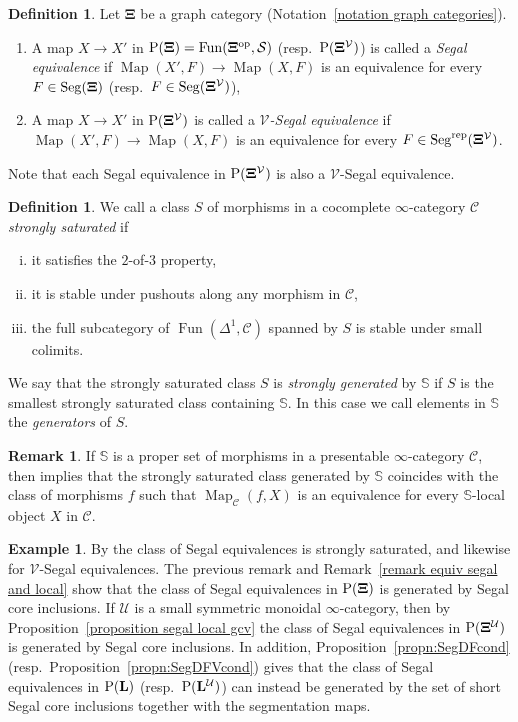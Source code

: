 \documentclass{amsart}
\numberwithin{theorem}{subsection}
\theoremstyle{definition}
\newtheorem{definition}[theorem]{Definition}
\newtheorem{example}[theorem]{Example}
\newtheorem{remark}[theorem]{Remark}
\providecommand{\op}{\mathrm{op}}
\newcommand{\xFun}{\operatorname{Fun}}
\newcommand{\xMap}{\operatorname{Map}}
\newcommand{\Map}{\operatorname{Map}}
\newcommand{\xcc}{\mathcal{C}}
\newcommand{\xS}{\mathcal{S}}
\newcommand{\xU}{\mathcal{U}}
\newcommand{\xV}{\mathcal{V}}
\newcommand{\Pre}{\name{P}}
\newcommand{\icat}{$\infty$-category}
\newcommand{\name}[1]{\ensuremath{\text{\textup{#1}}}}
\newcommand{\levelg}{\mathbf{L}}
\newcommand{\levelU}{\levelg^\xU}
\newcommand{\gc}{\mathbf{\Xi}}
\newcommand{\gcV}{\gc^{\xV}}
\newcommand{\Seg}{\name{Seg}}
\newcommand{\Segrep}{\Seg^{\name{rep}}}
\begin{document}
\begin{definition}\label{def set s}
Let $\gc$ be a graph category (Notation~\ref{notation graph categories}).
	\begin{enumerate}
		\item A map $X \to X'$ in $\Pre(\gc) = \xFun(\gc^\op,\xS)$ (resp.\ $\Pre(\gcV)$) is called a \emph{Segal equivalence} if $\Map(X', F) \to \Map(X, F)$ is an equivalence for every $F\in \Seg(\gc)$ (resp.\ $F\in \Seg(\gcV)$),
		\item A map $X \to X'$ in $\Pre(\gcV)$ is called a \emph{$\xV$-Segal equivalence} if $\Map(X', F) \to \Map(X, F)$ is an equivalence for every $F\in \Segrep(\gcV)$.
	\end{enumerate}
\end{definition}
Note that each Segal equivalence in $\Pre(\gcV)$ is also a $\xV$-Segal equivalence.
\begin{definition}\label{def strongly saturated}
	We call a class $S$ of morphisms in a cocomplete $\infty$-category $\xcc$ \emph{strongly saturated} if 
	\begin{enumerate}[(i)]
		\item it satisfies the $2$-of-$3$ property,
		\item it is stable under pushouts along any morphism in $\xcc$,
		\item the full subcategory of $\xFun(\Delta^1, \xcc)$ spanned by $S$ is stable under small colimits.
	\end{enumerate}
	We say that the strongly saturated class $S$ is \emph{strongly generated} by $\mathbb S$ if $S$ is the smallest strongly saturated class containing $\mathbb S$. In this case we call elements in $\mathbb S$ the \emph{generators} of $S$.
\end{definition}

\begin{remark}
	If $\mathbb{S}$ is a proper set of morphisms in a presentable $\infty$-category $\xcc$, then \cite[Proposition 5.5.4.15]{ht} implies that the strongly saturated class generated by $\mathbb{S}$ coincides with the class of morphisms $f$ such that $\xMap_\xcc(f, X)$ is an equivalence for every $\mathbb{S}$-local object $X$ in $\xcc$.
\end{remark}

\begin{example}\label{example seg equivs strongly saturated}
By \cite[Lemma 5.5.4.11]{ht} the class of Segal equivalences is strongly saturated, and likewise for $\xV$-Segal equivalences.
The previous remark and Remark~\ref{remark equiv segal and local} show that the class of Segal equivalences in $\Pre(\gc)$ is generated by Segal core inclusions.
If $\xU$ is a small symmetric monoidal \icat{}, then by Proposition~\ref{proposition segal local gcv} the class of Segal equivalences in $\Pre(\gc^\xU)$ is generated by Segal core inclusions.
In addition, Proposition~\ref{propn:SegDFcond} (resp.\ Proposition~\ref{propn:SegDFVcond}) gives that the class of Segal equivalences in $\Pre(\levelg)$ (resp.\ $\Pre(\levelU)$) can instead be generated by the set of short Segal core inclusions together with the segmentation maps.
\end{example}
\end{document}

